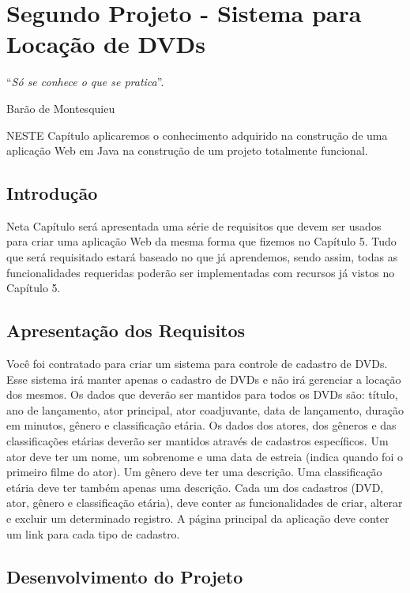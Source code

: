 \chapter{Segundo Projeto - Sistema para Locação de DVDs}\label{cap:segundoProjeto}
\epigraph{``\textit{Só se conhece o que se pratica}''.}{Barão de Montesquieu}

\lettrine[lines=4, lhang=0.1, lraise=0, loversize=0.2, findent=0.1em]{\textcolor{corAzulTema}{N}}{ESTE} Capítulo aplicaremos o conhecimento adquirido na construção de uma aplicação Web em Java na construção de um projeto totalmente funcional.


\section{Introdução}

Neta Capítulo será apresentada uma série de requisitos que devem ser usados para criar uma aplicação Web da mesma forma que fizemos no Capítulo 5. Tudo que será requisitado estará baseado no que já aprendemos, sendo assim, todas as funcionalidades requeridas poderão ser implementadas com recursos já vistos no Capítulo 5.


\section{Apresentação dos Requisitos}

Você foi contratado para criar um sistema para controle de cadastro de DVDs. Esse sistema irá manter apenas o cadastro de DVDs e não irá gerenciar a locação dos mesmos. Os dados que deverão ser mantidos para todos os DVDs são: título, ano de lançamento, ator principal, ator coadjuvante, data de lançamento, duração em minutos, gênero e classificação etária. Os dados dos atores, dos gêneros e das classificações etárias deverão ser mantidos através de cadastros específicos. Um ator deve ter um nome, um sobrenome e uma data de estreia (indica quando foi o primeiro filme do ator). Um gênero deve ter uma descrição. Uma classificação etária deve ter também apenas uma descrição. Cada um dos cadastros (DVD, ator, gênero e classificação etária), deve conter as funcionalidades de criar, alterar e excluir um determinado registro. A página principal da aplicação deve conter um link para cada tipo de cadastro.


\section{Desenvolvimento do Projeto}

